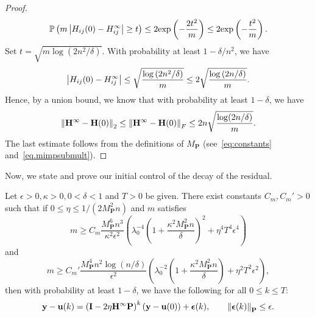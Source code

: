 \begin{proof}
\begin{equation}
    \mathbb{P}\left(m\left|H_{ij}(0) - H_{ij}^\infty\right| \geq t\right) \leq 2\text{exp}\left(-\frac{2t^2}{m}\right) \leq 2\text{exp}\left(-\frac{t^2}{m}\right).
\end{equation}
Set $t = \sqrt{m\log(2n^2/\delta)}$. With probability at least $1 - \delta/n^2$, we have
\begin{equation}
    \left|H_{ij}(0) - H_{ij}^\infty\right| \leq \sqrt{\frac{\log\left(2n^2/\delta\right)}{m}} \leq 2\sqrt{\frac{\log\left(2n/\delta\right)}{m}}.
\end{equation}
Hence, by a union bound, we know that with probability at least $1 - \delta$, we have
\begin{equation*}
    \left\lVert\mathbf{H}^\infty - \mathbf{H}(0)\right\rVert_2 \leq \left\lVert\mathbf{H}^\infty - \mathbf{H}(0)\right\rVert_F \leq 2n \sqrt{\frac{\log(2n/\delta)}{m}}.
\end{equation*}
The last estimate follows from the definitions of $M_{\mathbf{P}}$ (see~\cref{eq:constants} and~\cref{eq.mimpsubmult}).
\end{proof}

Now, we state and prove our initial control of the decay of the residual.

\begin{lem}\label{lem.initialdecouple}
Let $\epsilon > 0, \kappa > 0, 0 < \delta < 1$ and $T > 0$ be given. There exist constants $C_m, C_m' > 0$ such that if $0 \leq \eta \leq 1/(2M_{\mathbf{P}}^2n)$ and $m$ satisfies
\[
    m \geq C_m \frac{M_{\mathbf{P}}^6 n^3}{\kappa^2  \epsilon^2} \left(\lambda_0^{-4}\left(1 + \frac{\kappa^2 M_{\mathbf{P}}^2 n}{\delta}\right)^2 + \eta^4 T^4 \epsilon^4\right)
\]
    and
    \[
    m \geq C_m' \frac{M_{\mathbf{P}}^4 n^2 \log(n/\delta)}{\epsilon^2} \left(\lambda_0^{-2}\left(1 + \frac{\kappa^2 M_{\mathbf{P}}^2 n}{\delta}\right) + \eta^2 T^2 \epsilon^2\right),
\]
then with probability at least $1 - \delta$, we have the following for all $0\leq k\leq T$:
\begin{equation}\label{eq.errboundinit}
    \mathbf{y} - \mathbf{u}(k) = \left(\mathbf{I} - 2\eta \mathbf{H}^\infty\mathbf{P}\right)^k (\mathbf{y} - \mathbf{u}(0)) + \boldsymbol{\epsilon}(k), \qquad \left\lVert\boldsymbol{\epsilon}(k)\right\rVert_{\mathbf{P}} \leq \epsilon.
\end{equation}
\end{lem}

